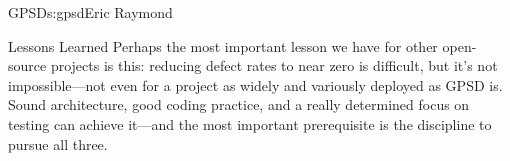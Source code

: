 \begin{aosachapter}{GPSD}{s:gpsd}{Eric Raymond}
\begin{aosasect1}{Lessons Learned}
Perhaps the most important lesson we have for other open-source
projects is this: reducing defect rates to near zero is difficult, but
it's not impossible---not even for a project as widely and variously
deployed as GPSD is.  Sound architecture, good coding practice, and a
really determined focus on testing can achieve it---and the most
important prerequisite is the discipline to pursue all three.

\end{aosasect1}

\end{aosachapter}
